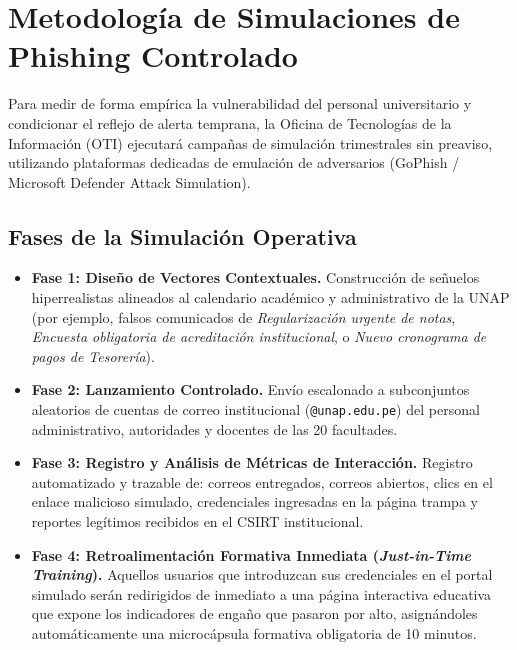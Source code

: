 \section{Metodología de Simulaciones de Phishing Controlado}

Para medir de forma empírica la vulnerabilidad del personal universitario y condicionar el reflejo de alerta temprana, la Oficina de Tecnologías de la Información (OTI) ejecutará campañas de simulación trimestrales sin preaviso, utilizando plataformas dedicadas de emulación de adversarios (GoPhish / Microsoft Defender Attack Simulation).

\subsection*{Fases de la Simulación Operativa}

\begin{itemize}[leftmargin=1.4em, itemsep=1.5pt, parsep=0.5pt, topsep=2pt]
    \item \textbf{Fase 1: Diseño de Vectores Contextuales.} Construcción de señuelos hiperrealistas alineados al calendario académico y administrativo de la UNAP (por ejemplo, falsos comunicados de \textit{Regularización urgente de notas}, \textit{Encuesta obligatoria de acreditación institucional}, o \textit{Nuevo cronograma de pagos de Tesorería}).
    
    \item \textbf{Fase 2: Lanzamiento Controlado.} Envío escalonado a subconjuntos aleatorios de cuentas de correo institucional (\texttt{@unap.edu.pe}) del personal administrativo, autoridades y docentes de las 20 facultades.
    
    \item \textbf{Fase 3: Registro y Análisis de Métricas de Interacción.} Registro automatizado y trazable de: correos entregados, correos abiertos, clics en el enlace malicioso simulado, credenciales ingresadas en la página trampa y reportes legítimos recibidos en el CSIRT institucional.
    
    \item \textbf{Fase 4: Retroalimentación Formativa Inmediata (\textit{Just-in-Time Training}).} Aquellos usuarios que introduzcan sus credenciales en el portal simulado serán redirigidos de inmediato a una página interactiva educativa que expone los indicadores de engaño que pasaron por alto, asignándoles automáticamente una microcápsula formativa obligatoria de 10 minutos.
\end{itemize}